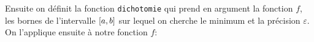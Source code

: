 {\begin{td-sol}
\begin{enumerate}
            Ensuite on définit la fonction \texttt{dichotomie} qui prend en argument la fonction \(f\), les bornes de l'intervalle \(\mathopen{}\left[a,b\right]\mathclose{}\)
            sur lequel on cherche le minimum et la précision \(\varepsilon\). On l'applique ensuite à notre fonction \(f\):
            
            \vspace{5pt}
            \begin{minipage}[c]{0.48\textwidth}
                \centering
            \end{minipage}\hfill
            \begin{minipage}[c]{0.48\textwidth}
                \centering
            \end{minipage}
            \vspace{5pt}


\end{enumerate}
\end{td-sol}}
